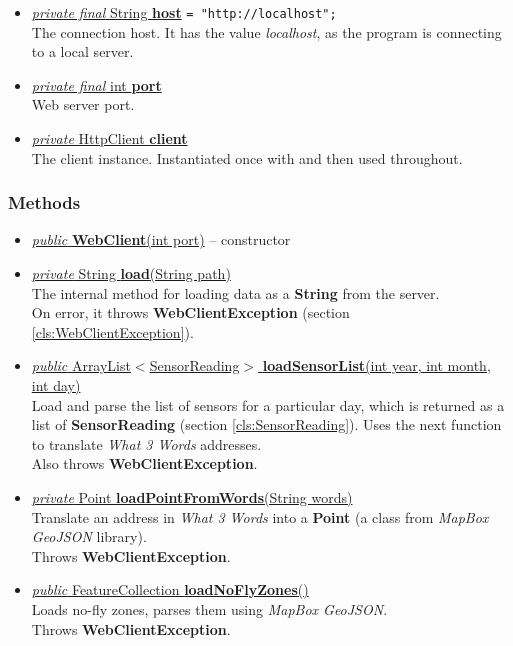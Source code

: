 \documentclass{article}
\newcommand{\sref}[1]{(section \ref{#1})}
\newcommand{\method}[4]{\underline{\textit{#1} #2 \textbf{#3}(#4)}}
\newcommand{\prop}[3]{\underline{\textit{#1} #2 \textbf{#3}}}
\begin{document}
\begin{itemize}
\item \prop{private final}{String}{host} \verb|= "http://localhost";| \\
  The connection host. It has the value \textit{localhost}, as the program is connecting to a local server.
\item \prop{private final}{int}{port} \\
  Web server port.
\item \prop{private}{HttpClient}{client} \\
  The client instance. Instantiated once with and then used throughout.
\end{itemize}

\subsubsection*{Methods}

\begin{itemize}
\item \underline{\textit{public} \textbf{WebClient}(int port)} -- constructor
  
\item \method{private}{String}{load}{String path} \\
  The internal method for loading data as a \textbf{String} from the server. \\
  On error, it throws \textbf{WebClientException} \sref{cls:WebClientException}.
\item \method{public}{ArrayList$<$SensorReading$>$}{loadSensorList}{int year, int month, int day} \\
  Load and parse the list of sensors for a particular day, which is returned as a list of \textbf{SensorReading} \sref{cls:SensorReading}. Uses the next function to translate \textit{What 3 Words} addresses.\\
  Also throws \textbf{WebClientException}.
  
\item \method{private}{Point}{loadPointFromWords}{String words} \\
  Translate an address in \textit{What 3 Words} into a \textbf{Point} (a class from \textit{MapBox GeoJSON} library).\\
  Throws \textbf{WebClientException}.

\item \method{public}{FeatureCollection}{loadNoFlyZones}{} \\
  Loads no-fly zones, parses them using \textit{MapBox GeoJSON}. \\
  Throws \textbf{WebClientException}.
\end{itemize}
\end{document}
